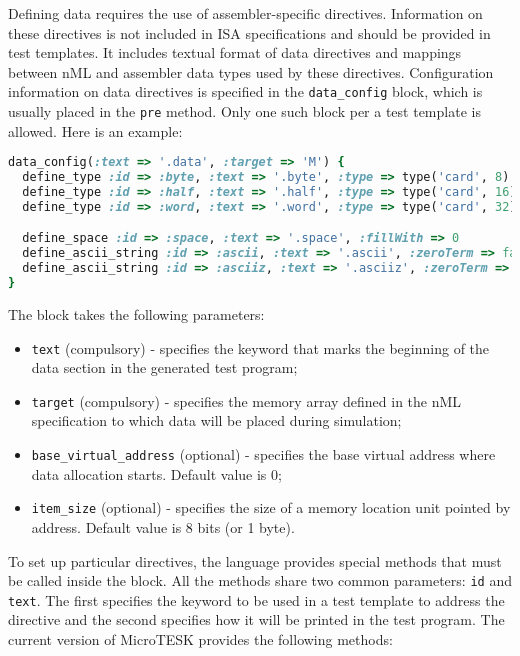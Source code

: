 \documentclass[oneside,final,12pt]{extreport}
\begin{document}
Defining data requires the use of assembler-specific directives. Information on
these directives is not included in ISA specifications and should be provided in test
templates. It includes textual format of data directives and mappings between nML and
assembler data types used by these directives. Configuration information on data
directives is specified in the \texttt{data{\_}config} block, which is usually placed
in the \texttt{pre} method. Only one such block per a test template is allowed.
Here is an example:

\begin{lstlisting}[language=ruby]
data_config(:text => '.data', :target => 'M') {
  define_type :id => :byte, :text => '.byte', :type => type('card', 8)
  define_type :id => :half, :text => '.half', :type => type('card', 16)
  define_type :id => :word, :text => '.word', :type => type('card', 32)

  define_space :id => :space, :text => '.space', :fillWith => 0
  define_ascii_string :id => :ascii, :text => '.ascii', :zeroTerm => false
  define_ascii_string :id => :asciiz, :text => '.asciiz', :zeroTerm => true
}
\end{lstlisting}

The block takes the following parameters:

\begin{itemize}
  \item \texttt{text} (compulsory) - specifies the keyword that marks the beginning of
        the data section in the generated test program;

  \item \texttt{target} (compulsory) - specifies the memory array defined in the nML
        specification to which data will be placed during simulation;

  \item \texttt{base{\_}virtual{\_}address} (optional) - specifies the base virtual
        address where data allocation starts. Default value is 0;

  \item \texttt{item{\_}size} (optional) - specifies the size of a memory location unit
        pointed by address. Default value is 8 bits (or 1 byte).
\end{itemize}

To set up particular directives, the language provides special methods that must
be called inside the block. All the methods share two common parameters:
\texttt{id} and \texttt{text}. The first specifies the keyword to be used in a
test template to address the directive and the second specifies how it will be
printed in the test program. The current version of MicroTESK provides the following methods:
\end{document}

